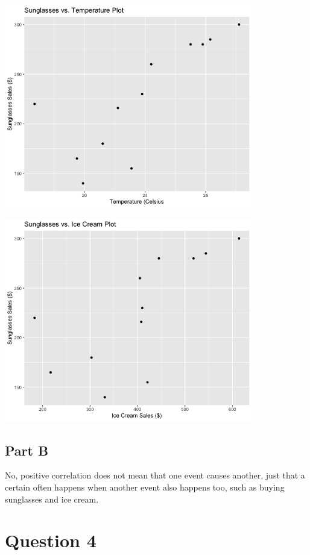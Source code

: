 \documentclass[letterpaper]{article}
\begin{document}
\begin{center}
    \includegraphics[height=3.5in]{sunglass_temp.png}
\end{center}

\begin{center}
    \includegraphics[height=3.5in]{sunglass_icecream.png}
\end{center}

\subsection*{Part B}

No, positive correlation does not mean that one event causes another, just that a certain often happens when another event also happens too, such as buying sunglasses and ice cream.

\newpage

\section*{Question 4}
\end{document}
